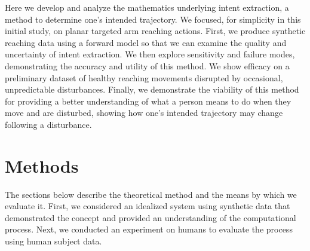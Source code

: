 \documentclass[10pt]{article}
\begin{document}
Here we develop and analyze the mathematics underlying intent extraction, a method to determine one's intended trajectory. We focused, for simplicity in this initial study, on planar targeted arm reaching actions. First, we produce synthetic reaching data using a forward model so that we can examine the quality and uncertainty of intent extraction. We then explore sensitivity and failure modes, demonstrating the accuracy and utility of this method. We show efficacy on a preliminary dataset of healthy reaching movements disrupted by occasional, unpredictable disturbances. Finally, we demonstrate the viability of this method for providing a better understanding of what a person means to do when they move and are disturbed, showing how one's intended trajectory may change following a disturbance.



\section*{Methods}
The sections below describe the theoretical method and the means by which we evaluate it. First, we considered an idealized system using synthetic data that demonstrated the concept and provided an understanding of the computational process. Next, we conducted an experiment on humans to evaluate the process using human subject data. 
\end{document}
